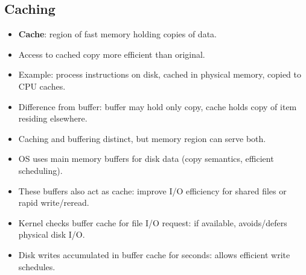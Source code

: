 \subsection{Caching}
\begin{itemize}
    \item \textbf{Cache}: region of fast memory holding copies of data.
    \item Access to cached copy more efficient than original.
    \item Example: process instructions on disk, cached in physical memory, copied to CPU caches.
    \item Difference from buffer: buffer may hold only copy, cache holds copy of item residing elsewhere.
    \item Caching and buffering distinct, but memory region can serve both.
    \item OS uses main memory buffers for disk data (copy semantics, efficient scheduling).
    \item These buffers also act as cache: improve I/O efficiency for shared files or rapid write/reread.
    \item Kernel checks buffer cache for file I/O request: if available, avoids/defers physical disk I/O.
    \item Disk writes accumulated in buffer cache for seconds: allows efficient write schedules.
\end{itemize}

